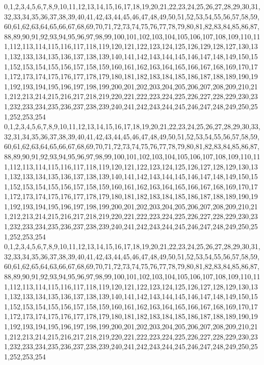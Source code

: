 \documentclass[12pt]{article}
\begin{document}
{0,1,2,3,4,5,6,7,8,9,10,11,12,13,14,15,16,17,18,19,20,21,22,23,24,25,26,27,28,29,30,31,32,33,34,35,36,37,38,39,40,41,42,43,44,45,46,47,48,49,50,51,52,53,54,55,56,57,58,59,60,61,62,63,64,65,66,67,68,69,70,71,72,73,74,75,76,77,78,79,80,81,82,83,84,85,86,87,88,89,90,91,92,93,94,95,96,97,98,99,100,101,102,103,104,105,106,107,108,109,110,111,112,113,114,115,116,117,118,119,120,121,122,123,124,125,126,129,128,127,130,131,132,133,134,135,136,137,138,139,140,141,142,143,144,145,146,147,148,149,150,151,152,153,154,155,156,157,158,159,160,161,162,163,164,165,166,167,168,169,170,171,172,173,174,175,176,177,178,179,180,181,182,183,184,185,186,187,188,189,190,191,192,193,194,195,196,197,198,199,200,201,202,203,204,205,206,207,208,209,210,211,212,213,214,215,216,217,218,219,220,221,222,223,224,225,226,227,228,229,230,231,232,233,234,235,236,237,238,239,240,241,242,243,244,245,246,247,248,249,250,251,252,253,254\\
0,1,2,3,4,5,6,7,8,9,10,11,12,13,14,15,16,17,18,19,20,21,22,23,24,25,26,27,28,29,30,33,32,31,34,35,36,37,38,39,40,41,42,43,44,45,46,47,48,49,50,51,52,53,54,55,56,57,58,59,60,61,62,63,64,65,66,67,68,69,70,71,72,73,74,75,76,77,78,79,80,81,82,83,84,85,86,87,88,89,90,91,92,93,94,95,96,97,98,99,100,101,102,103,104,105,106,107,108,109,110,111,112,113,114,115,116,117,118,119,120,121,122,123,124,125,126,127,128,129,130,131,132,133,134,135,136,137,138,139,140,141,142,143,144,145,146,147,148,149,150,151,152,153,154,155,156,157,158,159,160,161,162,163,164,165,166,167,168,169,170,171,172,173,174,175,176,177,178,179,180,181,182,183,184,185,186,187,188,189,190,191,192,193,194,195,196,197,198,199,200,201,202,203,204,205,206,207,208,209,210,211,212,213,214,215,216,217,218,219,220,221,222,223,224,225,226,227,228,229,230,231,232,233,234,235,236,237,238,239,240,241,242,243,244,245,246,247,248,249,250,251,252,253,254\\
0,1,2,3,4,5,6,7,8,9,10,11,12,13,14,15,16,17,18,19,20,21,22,23,24,25,26,27,28,29,30,31,32,33,34,35,36,37,38,39,40,41,42,43,44,45,46,47,48,49,50,51,52,53,54,55,56,57,58,59,60,61,62,65,64,63,66,67,68,69,70,71,72,73,74,75,76,77,78,79,80,81,82,83,84,85,86,87,88,89,90,91,92,93,94,95,96,97,98,99,100,101,102,103,104,105,106,107,108,109,110,111,112,113,114,115,116,117,118,119,120,121,122,123,124,125,126,127,128,129,130,131,132,133,134,135,136,137,138,139,140,141,142,143,144,145,146,147,148,149,150,151,152,153,154,155,156,157,158,159,160,161,162,163,164,165,166,167,168,169,170,171,172,173,174,175,176,177,178,179,180,181,182,183,184,185,186,187,188,189,190,191,192,193,194,195,196,197,198,199,200,201,202,203,204,205,206,207,208,209,210,211,212,213,214,215,216,217,218,219,220,221,222,223,224,225,226,227,228,229,230,231,232,233,234,235,236,237,238,239,240,241,242,243,244,245,246,247,248,249,250,251,252,253,254\\
}
\end{document}
